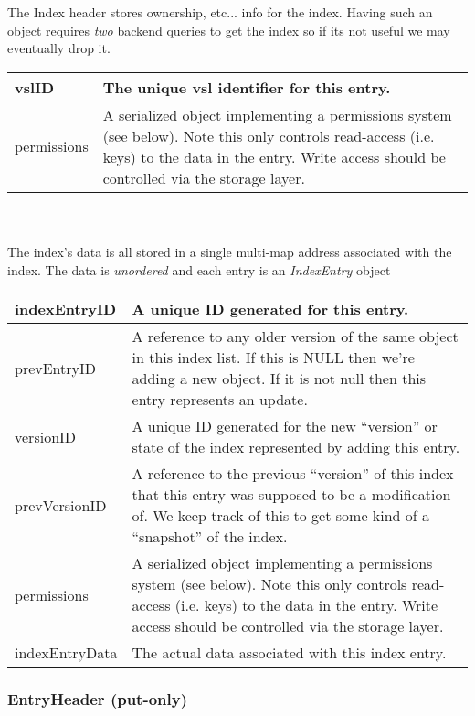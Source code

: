 \documentclass[10pt]{article}
\begin{document}
The Index header stores ownership, etc... info for the index.  Having such an
object requires {\em two} backend queries to get the index so if its not useful
we may eventually drop it.\\

\begin{tabular}{|l|p{12cm}|}
\hline
vslID & The unique vsl identifier for this entry.\\
\hline
permissions & A serialized object implementing a permissions system (see below).
Note this only controls read-access (i.e. keys) to the data in the entry.  Write
access should be controlled via the storage layer. \\
\hline
\end{tabular}
\\
\\
\noindent The index's data is all stored in a single multi-map address associated with the
index.  The data is {\em unordered} and each entry is an {\em IndexEntry}
object\\

\begin{tabular}{|l|p{12cm}|}
\hline
indexEntryID & A unique ID generated for this entry. \\
\hline
prevEntryID & A reference to any older version of the same object in this index
list.  If this is NULL then we're adding a new object.  If it is not null then
this entry represents an update.\\
\hline
versionID & A unique ID generated for the new ``version'' or state of the index
represented by adding this entry.\\
\hline 
prevVersionID & A reference to the previous ``version'' of this index that this
entry was supposed to be a modification of.  We keep track of this to get some
kind of a ``snapshot'' of the index.\\
\hline
permissions & A serialized object implementing a permissions system (see below).
Note this only controls read-access (i.e. keys) to the data in the entry.  Write
access should be controlled via the storage layer. \\
\hline
indexEntryData &  The actual data associated with this index entry.\\
\hline
\end{tabular}


\subsubsection{EntryHeader (put-only)}
\end{document}
